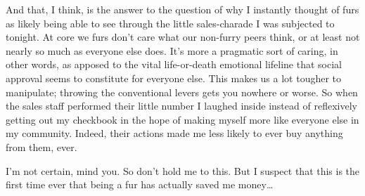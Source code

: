 And that, I think, is the answer to the question of why I instantly thought of furs as likely being able to see through the little sales-charade I was subjected to tonight. At core we furs don't care what our non-furry peers think, or at least not nearly so much as everyone else does. It's more a pragmatic sort of caring, in other words, as apposed to the vital life-or-death emotional lifeline that social approval seems to constitute for everyone else. This makes us a lot tougher to manipulate; throwing the conventional levers gets you nowhere or worse. So when the sales staff performed their little number I laughed inside instead of reflexively getting out my checkbook in the hope of making myself more like everyone else in my community. Indeed, their actions made me less likely to ever buy anything from them, ever.

I'm not certain, mind you. So don't hold me to this. But I suspect that this is the first time ever that being a fur has actually saved me money\ldots
